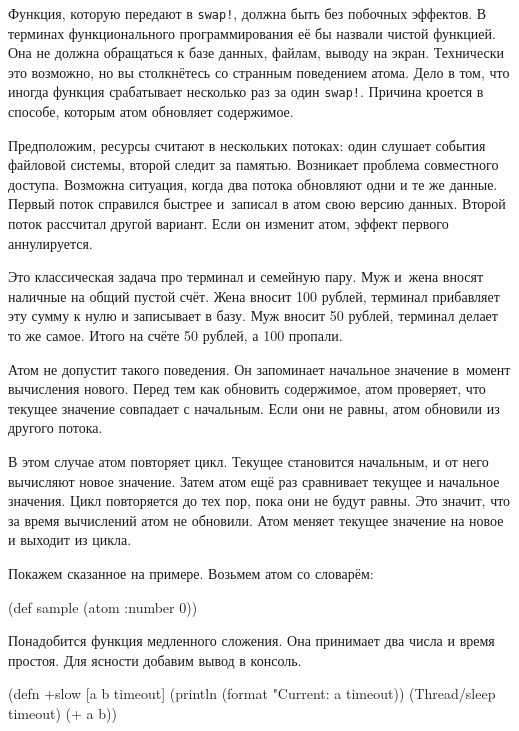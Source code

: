 Функция, которую передают в \verb|swap!|, должна быть без побочных эффектов. В
терминах функционального программирования её бы назвали чистой функцией. Она не
должна обращаться к базе данных, файлам, выводу на экран. Технически это
возможно, но вы столкнётесь со странным поведением атома. Дело в том, что иногда
функция срабатывает несколько раз за один \verb|swap!|. Причина кроется в
способе, которым атом обновляет содержимое.

Предположим, ресурсы считают в нескольких потоках: один слушает события файловой
системы, второй следит за памятью. Возникает проблема совместного
доступа. Возможна ситуация, когда два потока обновляют одни и те же
данные. Первый поток справился быстрее и~записал в атом свою версию
данных. Второй поток рассчитал другой вариант. Если он изменит атом, эффект
первого аннулируется.


Это классическая задача про терминал и семейную пару. Муж и~жена вносят наличные
на общий пустой счёт. Жена вносит 100 рублей, терминал прибавляет эту сумму к
нулю и записывает в базу. Муж вносит 50 рублей, терминал делает то же
самое. Итого на счёте 50 рублей, а 100 пропали.

Атом не допустит такого поведения. Он запоминает начальное значение в~момент
вычисления нового. Перед тем как обновить содержимое, атом проверяет, что
текущее значение совпадает с начальным. Если они не равны, атом обновили из
другого потока.

В этом случае атом повторяет цикл. Текущее становится начальным, и от него
вычисляют новое значение. Затем атом ещё раз сравнивает текущее и начальное
значения. Цикл повторяется до тех пор, пока они не будут равны. Это значит, что
за время вычислений атом не обновили. Атом меняет текущее значение на новое и
выходит из цикла.

Покажем сказанное на примере. Возьмем атом со словарём:

\begin{english}
  \begin{clojure}
(def sample
  (atom {:number 0}))
  \end{clojure}
\end{english}

Понадобится функция медленного сложения. Она принимает два числа и время
простоя. Для ясности добавим вывод в консоль.

\pagebreaklarge

\ifnarrow

\begin{english}
  \begin{clojure}
(defn +slow
  [a b timeout]
  (println
    (format "Current: %
      a timeout))
  (Thread/sleep timeout)
  (+ a b))
  \end{clojure}
\end{english}

